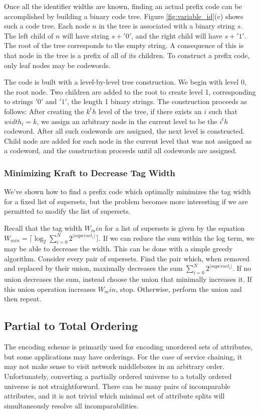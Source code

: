  Once all the identifier widths are known, finding an actual prefix code can be accomplished by building a binary code tree. Figure \ref{fig:variable_id}(c) shows such a code tree. Each node $n$ in the tree is associated with a binary string $s$. The left child of $n$ will have string $s + '0'$, and the right child will have $s + '1'$. The root of the tree corresponds to the empty string. A consequence of this is that node in the tree is a prefix of all of its children. To construct a prefix code, only leaf nodes may be codewords. 
 
 The code is built with a level-by-level tree construction. We begin with level 0, the root node. Two children are added to the root to create level 1, corresponding to strings $'0'$ and $'1'$, the length 1 binary strings. The construction proceeds as follows:  After creating the $k^th$ level of the tree, if there exists an $i$ such that $width_i = k$, we assign an arbitrary node in the current level to be the $i^th$ codeword. After all such codewords are assigned, the next level is constructed. Child node are added for each node in the current level that was not assigned as a codeword, and the construction proceeds until all codewords are assigned.
 
\subsubsection{Minimizing Kraft to Decrease Tag Width}
We've shown how to find a prefix code which optimally minimizes the tag width for a fixed list of supersets, but the problem becomes more interesting if we are permitted to modify the list of supersets. 

Recall that the tag width $W_min$ for a list of supersets is given by the equation $W_{min} = \lceil\log_2{\sum_{i = 0}^{N}{2^{|superset_i|}}}\rceil$. If we can reduce the sum within the log term, we may be able to decrease the width. This can be done with a simple greedy algorithm. Consider every pair of supersets. Find the pair which, when removed and replaced by their union, maximally decreases the sum ${\sum_{i = 0}^{N}{2^{|superset_i|}}}$. If no union decreases the sum, instead choose the union that minimally increases it. If this union operation increases $W_min$, stop. Otherwise, perform the union and then repeat. 

\subsection{Partial to Total Ordering}
The encoding scheme is primarily used for encoding unordered sets of attributes, but some applications may have orderings. For the case of service chaining, it may not make sense to visit network middleboxes in an arbitrary order. 
Unfortunately, converting a partially ordered universe to a totally ordered universe is not straightforward. There can be many pairs of incomparable attributes, and it is not trivial which minimal set of attribute splits will simultaneously resolve all incomparabilities. 


